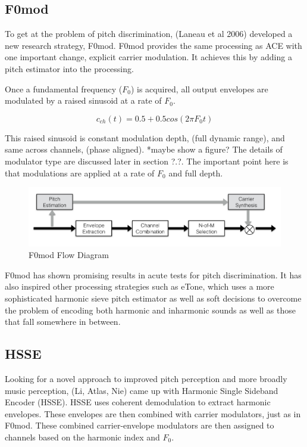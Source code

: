 \documentclass [11pt, proquest] {uwthesis}[2015/03/03]
\begin{document}
\subsection{F0mod}

To get at the problem of pitch discrimination, (Laneau et al 2006) developed a new research strategy, F0mod.  F0mod provides the same processing as ACE with one important change, explicit carrier modulation.  It achieves this by adding a pitch estimator into the processing.

Once a fundamental frequency ($F_0$) is acquired, all output envelopes are modulated by a raised sinusoid at a rate of $F_0$.  

$$c_{ch}(t) = 0.5 + 0.5cos(2\pi F_0t)$$

This raised sinusoid is constant modulation depth, (full dynamic range), and same across channels, (phase aligned).  *maybe show a figure?  The details of modulator type are discussed later in section ?.?.  The important point here is that modulations are applied at a rate of $F_0$ and full depth.

\begin{figure}[!ht]
  \centering
    \includegraphics[width=1\textwidth]{F0mod_flow_diagramTEMP}   
    \caption{F0mod Flow Diagram}
\end{figure}

F0mod has shown promising results in acute tests for pitch discrimination.  It has also inspired other processing strategies such as eTone, which uses a more sophisticated harmonic sieve pitch estimator as well as soft decisions to overcome the problem of encoding both harmonic and inharmonic sounds as well as those that fall somewhere in between.

\subsection{HSSE}

Looking for a novel approach to improved pitch perception and more broadly music perception, (Li, Atlas, Nie) came up with Harmonic Single Sideband Encoder (HSSE).  HSSE uses coherent demodulation to extract harmonic envelopes.  These envelopes are then combined with carrier modulators, just as in F0mod.  These combined carrier-envelope modulators are then assigned to channels based on the harmonic index and $F_0$.
\end{document}
